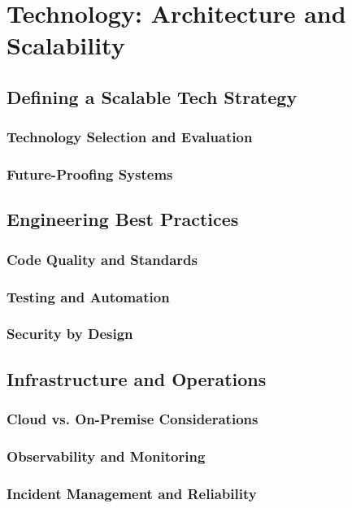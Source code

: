 \chapter{Technology: Architecture and Scalability}
\section{Defining a Scalable Tech Strategy}
\subsection{Technology Selection and Evaluation}
\subsection{Future-Proofing Systems}
\section{Engineering Best Practices}
\subsection{Code Quality and Standards}
\subsection{Testing and Automation}
\subsection{Security by Design}
\section{Infrastructure and Operations}
\subsection{Cloud vs. On-Premise Considerations}
\subsection{Observability and Monitoring}
\subsection{Incident Management and Reliability}